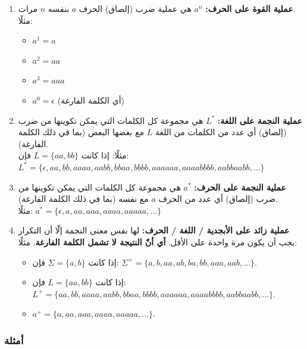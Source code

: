 \documentclass[12pt]{article}
\begin{document}
\begin{enumerate}
\item
    \textbf{عملية القوة على الحرف:} $a^n$ هي عملية ضرب (إلصاق) الحرف $a$ بنفسه $n$ مرات. \\
    مثلًا:
    \begin{itemize}
        \item $a^1 = a$
        \item $a^2 = aa$
        \item $a^3 = aaa$
        \item $a^0 = \epsilon$ (أي الكلمة الفارغة)
    \end{itemize}

\item
    \textbf{عملية النجمة على اللغة:} $L^*$ هي مجموعة كل الكلمات التي يمكن تكوينها من ضرب (إلصاق) أي عدد من الكلمات من اللغة $L$ مع بعضها البعض (بما في ذلك الكلمة الفارغة). \\
    مثلًا: إذا كانت $L = \{aa,bb\}$ فإن: \\
    $L^* = \{\epsilon, aa, bb, aaaa, aabb, bbaa, bbbb, aaaaaa, aaaabbbb, aabbaabb, \dots\}$

\item
    \textbf{عملية النجمة على الحرف:} $a^*$ هي مجموعة كل الكلمات التي يمكن تكوينها من ضرب (إلصاق) أي عدد من الحرف $a$ مع نفسه (بما في ذلك الكلمة الفارغة). \\
    مثلًا: $a^* = \{\epsilon, a, aa, aaa, aaaa, aaaaa, \dots\}$

\item \textbf{عملية زائد على الأبجدية / اللغة / الحرف:}
    لها نفس معنى النجمة إلّا أن التكرار يجب أن يكون مرة واحدة على الأقل.
    \textbf{أي أنّ النتيجة لا تشمل الكلمة الفارغة}.
    مثلًا:
    \begin{itemize}
        \item إذا كانت $\Sigma = \{a,b\}$ فإن: $\Sigma^+ = \{a, b, aa, ab, ba, bb, aaa, aab, \dots\}$.
        \item إذا كانت $L = \{aa,bb\}$ فإن:\\
        $L^+ = \{aa, bb, aaaa, aabb, bbaa, bbbb, aaaaaa, aaaabbbb, aabbaabb, \dots\}$.
        \item $a^+ = \{a, aa, aaa, aaaa, aaaaa, \dots\}$.
    \end{itemize}

\end{enumerate}

\subsubsection{أمثلة}
\end{document}
